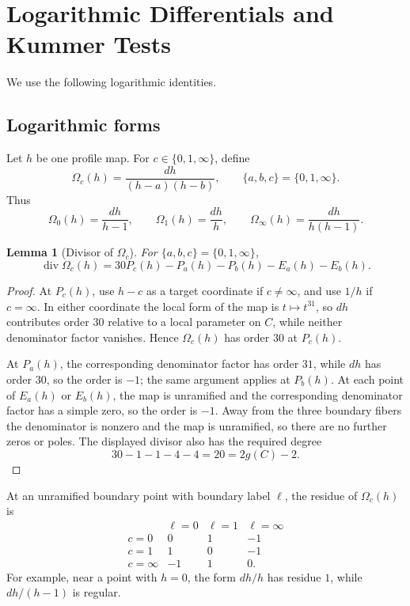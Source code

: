 \documentclass[11pt]{amsart}
\newtheorem{lemma}[theorem]{Lemma}
\newcommand{\Div}{\operatorname{div}}
\begin{document}
\section{Logarithmic Differentials and Kummer Tests}
\label{sec:kummer}

We use the following logarithmic identities.

\subsection{Logarithmic forms}

Let \(h\) be one profile map.  For \(c\in\{0,1,\infty\}\), define
\[
  \Omega_c(h)=\frac{dh}{(h-a)(h-b)},\qquad \{a,b,c\}=\{0,1,\infty\}.
\]
Thus
\[
  \Omega_0(h)=\frac{dh}{h-1},\qquad
  \Omega_1(h)=\frac{dh}{h},\qquad
  \Omega_\infty(h)=\frac{dh}{h(h-1)}.
\]

\begin{lemma}[Divisor of \(\Omega_c\)]
\label{lem:omega-divisor}
For \(\{a,b,c\}=\{0,1,\infty\}\),
\[
  \Div\Omega_c(h)
  =30P_c(h)-P_a(h)-P_b(h)-E_a(h)-E_b(h).
\]
\end{lemma}

\begin{proof}
At \(P_c(h)\), use \(h-c\) as a target coordinate if \(c\ne\infty\), and use
\(1/h\) if \(c=\infty\).  In either coordinate the local form of the map is
\(t\mapsto t^{31}\), so \(dh\) contributes order \(30\) relative to a local
parameter on \(C\), while neither denominator factor vanishes.  Hence
\(\Omega_c(h)\) has order \(30\) at \(P_c(h)\).

At \(P_a(h)\), the corresponding denominator factor has order \(31\), while
\(dh\) has order \(30\), so the order is \(-1\); the same argument applies at
\(P_b(h)\).  At each point of \(E_a(h)\) or \(E_b(h)\), the map is unramified
and the corresponding denominator factor has a simple zero, so the order is
\(-1\).  Away from the three boundary fibers the denominator is nonzero and
the map is unramified, so there are no further zeros or poles.  The displayed
divisor also has the required degree
\[
  30-1-1-4-4=20=2g(C)-2.
\]
\end{proof}

At an unramified boundary point with boundary label \(\ell\), the residue of
\(\Omega_c(h)\) is
\[
\begin{array}{c|ccc}
       & \ell=0 & \ell=1 & \ell=\infty\\ \hline
c=0    & 0&1&-1\\
c=1    & 1&0&-1\\
c=\infty&-1&1&0 .
\end{array}
\]
For example, near a point with \(h=0\), the form \(dh/h\) has residue \(1\),
while \(dh/(h-1)\) is regular.
\end{document}
